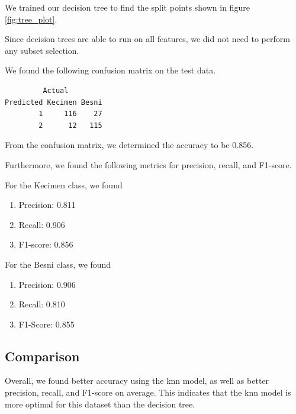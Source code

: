 \documentclass{article}
\begin{document}
\noindent We trained our decision tree to find the split points shown in figure \ref{fig:tree_plot}.


\noindent Since decision trees are able to run on all features, we did not need to perform any subset selection.

\noindent We found the following confusion matrix on the test data.

\begin{verbatim}
         Actual
Predicted Kecimen Besni
        1     116    27
        2      12   115
\end{verbatim}

\noindent From the confusion matrix, we determined the accuracy to be 0.856.

\noindent Furthermore, we found the following metrics for precision, recall, and F1-score.

\noindent For the Kecimen class, we found

\begin{enumerate}
    \item Precision: 0.811

    \item Recall: 0.906

    \item F1-score: 0.856
\end{enumerate}

\noindent  For the Besni class, we found

\begin{enumerate}
    \item Precision: 0.906

    \item Recall: 0.810

    \item F1-Score: 0.855
\end{enumerate}

\subsection*{Comparison}

Overall, we found better accuracy using the knn model, as well as better precision, recall, and F1-score on average. This indicates that the knn model is more optimal for this dataset than the decision tree.
\end{document}
